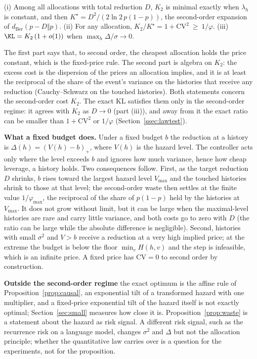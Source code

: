\begin{prop}\label{prop:waste}
(i) Among all allocations with total reduction $D$, $K_2$ is minimal exactly when $\lambda_h$ is constant, and then $K^\star=D^2/(2\ln 2\,p(1-p))$, the second-order expansion of $d_{\mathrm{Ber}}(p-D\Vert p)$.
(ii) For any allocation, $K_2/K^\star=1+\mathrm{CV}^2\ \ge\ 1/\varphi$.
(iii) $\KL=K_2\,(1+o(1))$ when $\max_h\Delta/\sigma\to0$.
\end{prop}
The first part says that, to second order, the cheapest allocation holds the price constant, which is the fixed-price rule. The second part is algebra on $K_2$: the excess cost is the dispersion of the prices an allocation implies, and it is at least the reciprocal of the share of the event's variance on the histories that receive any reduction (Cauchy--Schwarz on the touched histories). Both statements concern the second-order cost $K_2$. The exact KL satisfies them only in the second-order regime: it agrees with $K_2$ as $D\to0$ (part (iii)), and away from it the exact ratio can be smaller than $1+\mathrm{CV}^2$ or $1/\varphi$ (Section~\ref{ssec:lawtest}).

\textbf{What a fixed budget does.} Under a fixed budget $b$ the reduction at a history is $\Delta(h)=(V(h)-b)_+$, where $V(h)$ is the hazard level. The controller acts only where the level exceeds $b$ and ignores how much variance, hence how cheap leverage, a history holds. Two consequences follow. First, as the target reduction $D$ shrinks, $b$ rises toward the largest hazard level $V_{\max}$ and the touched histories shrink to those at that level; the second-order waste then settles at the finite value $1/\varphi_{\max}$, the reciprocal of the share of $p(1-p)$ held by the histories at $V_{\max}$. It does not grow without limit, but it can be large when the maximal-level histories are rare and carry little variance, and both costs go to zero with $D$ (the ratio can be large while the absolute difference is negligible). Second, histories with small $\sigma^2$ and $V>b$ receive a reduction at a very high implied price; at the extreme the budget is below the floor $\min_vH(h,v)$ and the step is infeasible, which is an infinite price. A fixed price has $\mathrm{CV}=0$ to second order by construction.

\textbf{Outside the second-order regime} the exact optimum is the affine rule of Proposition~\ref{prop:causal}, an exponential tilt of a transformed hazard with one multiplier, and a fixed-price exponential tilt of the hazard itself is not exactly optimal; Section~\ref{sec:small} measures how close it is. Proposition~\ref{prop:waste} is a statement about the hazard as risk signal. A different risk signal, such as the recurrence risk on a language model, changes $\sigma^2$ and $\Delta$ but not the allocation principle; whether the quantitative law carries over is a question for the experiments, not for the proposition.

